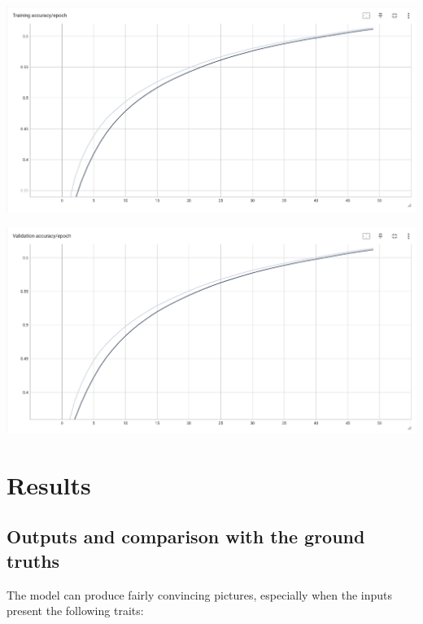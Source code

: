 \documentclass[conference]{IEEEtran}
\begin{document}
\begin{center}
    \begin{minipage}{0.75\linewidth}
        \includegraphics[width=\linewidth]{images/training_accuracy_graph.png}
    \end{minipage}
\end{center}
\begin{center}
    \begin{minipage}{0.75\linewidth}
        \includegraphics[width=\linewidth]{images/validation_accuracy_graph.png}
    \end{minipage}
\end{center}

\section{Results}

\subsection{Outputs and comparison with the ground truths}
The model can produce fairly convincing pictures, especially when the inputs present the following traits:
\end{document}
